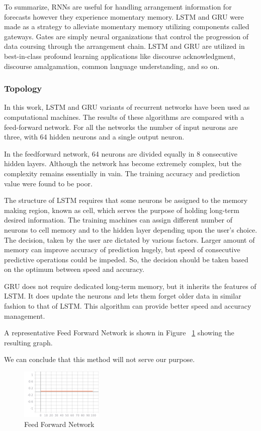 To summarize, RNNs are useful for handling arrangement information for forecasts however they experience momentary memory. LSTM and GRU were made as a strategy to alleviate momentary memory utilizing components called gateways. Gates are simply neural organizations that control the progression of data coursing through the arrangement chain. LSTM and GRU are utilized in best-in-class profound learning applications like discourse acknowledgment, discourse amalgamation, common language understanding, and so on. 

\subsubsection{Topology}

In this work, LSTM and GRU variants of recurrent networks have been used as computational machines. The results of these algorithms are compared with a feed-forward network. For all the networks the number of input neurons are three, with 64 hidden neurons and a single output neuron.  

In the feedforward network, 64 neurons are divided equally in 8 consecutive hidden layers. Although the network has become extremely complex, but the complexity remains essentially in vain. The training accuracy and prediction value were found to be poor. 

The structure of LSTM requires that some neurons be assigned to the memory making region, known as cell, which serves the purpose of holding long-term desired information. The training machines can assign different number of neurons to cell memory and to the hidden layer depending upon the user's choice. The decision, taken by the user are dictated by various factors. Larger amount of memory can improve accuracy of prediction hugely, but speed of consecutive predictive operations could be impeded. So, the decision should be taken based on the optimum between speed and accuracy. 

GRU does not require dedicated long-term memory, but it inherits the features of LSTM. It does update the neurons and lets them forget older data in similar fashion to that of LSTM. This algorithm can provide better speed and accuracy management.  

A representative Feed Forward Network is shown in Figure ~\ref{fig:feedforward} showing the resulting graph.

We can conclude that this method will not serve our purpose. 


\begin{figure}[h!]
	\centering
	\includegraphics[width=0.35\textwidth]{fig/epoch_accuracy.png}
	\caption{Feed Forward Network}
	\label{fig:feedforward}
\end{figure}



